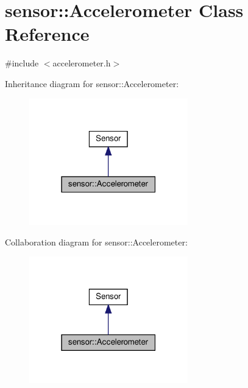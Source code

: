 \hypertarget{classsensor_1_1_accelerometer}{}\section{sensor\+:\+:Accelerometer Class Reference}
\label{classsensor_1_1_accelerometer}


{\ttfamily \#include $<$accelerometer.\+h$>$}



Inheritance diagram for sensor\+:\+:Accelerometer\+:\nopagebreak
\begin{figure}[H]
\begin{center}
\leavevmode
\includegraphics[width=195pt]{classsensor_1_1_accelerometer__inherit__graph}
\end{center}
\end{figure}


Collaboration diagram for sensor\+:\+:Accelerometer\+:\nopagebreak
\begin{figure}[H]
\begin{center}
\leavevmode
\includegraphics[width=195pt]{classsensor_1_1_accelerometer__coll__graph}
\end{center}
\end{figure}
